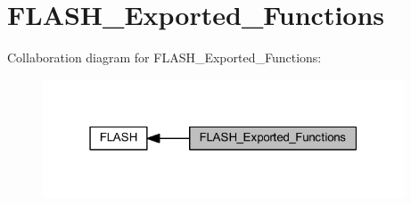 \hypertarget{group___f_l_a_s_h___exported___functions}{}\section{F\+L\+A\+S\+H\+\_\+\+Exported\+\_\+\+Functions}
\label{group___f_l_a_s_h___exported___functions}
Collaboration diagram for F\+L\+A\+S\+H\+\_\+\+Exported\+\_\+\+Functions\+:
\nopagebreak
\begin{figure}[H]
\begin{center}
\leavevmode
\includegraphics[width=304pt]{group___f_l_a_s_h___exported___functions}
\end{center}
\end{figure}
